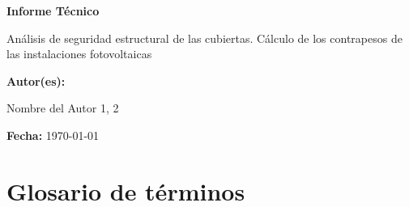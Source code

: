 \documentclass[a4paper,12pt]{article}
\let\OldTextField\TextField
\renewcommand{\TextField}[2][]{%
  \raisebox{-0.1ex}{\OldTextField[height=.95em,  bordercolor={1 1 1}, backgroundcolor={1 1 1},#1]{#2}}%
}
\begin{document}
\begin{Form}




\begin{titlepage}
    \centering
    {\scshape\LARGE  \par}
    \vspace{1cm}
    {\Huge\bfseries Informe Técnico\par}
    \vspace{2cm}
    {\Large Análisis de seguridad estructural de
    las cubiertas. Cálculo de los contrapesos de las
    instalaciones fotovoltaicas \par}
    \vspace{1cm}
    \vfill
    \textbf{Autor(es):}\par
    Nombre del Autor 1,\TextField[name=Tecnico,width=4cm,default=Juan Pérez]{} 2\par
    \vspace{0.5cm}
    \textbf{Fecha:} \today \par
\end{titlepage}

\begin{abstract}
  El texto del resumen debe estar de acuerdo con la Norma UNE 50103. En síntesis, debe ser tan informativo como lo
  permita la naturaleza del documento, para que los lectores puedan decidir si es necesario leer el documento completo;
  debe definir el objetivo, métodos, resultados y conclusiones presentadas en el documento original, bien en ese orden,
  o destacando inicialmente los resultados y conclusiones; debe constituir un texto completo, para que sea inteligible sin
  necesidad de referirse al documento. Debe ser conciso sin ser oscuro, reteniendo la información básica y el carácter
  del documento original. Los resúmenes de la mayoría de los informes deben tener menos de 250 palabras y en ningún
  caso más de 500; Deben estar escritos en un solo párrafo; emplear normalmente frases completas, verbos en forma
  activa y con tercera persona. No se deben utilizar figuras y símbolos, tales como tablas cortas y fórmulas, más que
  cuando no haya ninguna alternativa aceptable.\end{abstract}

\tableofcontents

\section*{Glosario de términos}


\end{Form}
\end{document}
